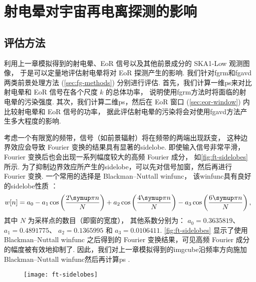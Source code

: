 
\chapter{射电晕对宇宙再电离探测的影响}
\label{chap:halo}

\section{评估方法}

利用上一章模拟得到的射电晕、EoR 信号以及其他前景成分的 SKA1-Low 观测图像，
于是可以定量地评估射电晕将对 EoR 探测产生的影响.
我们针对\ac{fgrm}和\ac{fgavd}两类前景处理方法 (\autoref{sec:fg-methods})
分别进行评估.
首先，我们计算一维\ac{ps}来对比射电晕和 EoR 信号在各个尺度 $k$ 的总体功率，
说明使用\ac{fgrm}方法时将面临的射电晕的污染强度.
其次，我们计算二维\ac{ps}，然后在 EoR 窗口 (\autoref{sec:eor-window})
内比较射电晕和 EoR 信号的功率，
据此评估射电晕的污染将会对使用\ac{fgavd}方法产生多大程度的影响.

考虑一个有限宽的频带，信号（如前景辐射）将在频带的两端出现跃变，
这种边界效应会导致 Fourier 变换的结果具有显著的\ac{sidelobe}.
即使输入信号非常平滑，Fourier 变换后也会出现一系列幅度较大的高频 Fourier 成分，
如\autoref{fig:ft-sidelobes} 所示.
为了抑制边界效应所产生的\ac{sidelobe}，可以先对信号加窗，然后再进行 Fourier 变换.
一个常用的选择是 Blackman--Nuttall \ac{winfunc}，
该\ac{winfunc}具有良好的\ac{sidelobe}性质 \cite{nuttall1981}：
\begin{equation}
  w[n] = a_0 - a_1 \cos\left(\frac{2\Cpi n}{N}\right)
    + a_2 \cos\left(\frac{4\Cpi n}{N}\right)
    - a_3 \cos\left(\frac{6\Cpi n}{N}\right) ,
\end{equation}
其中
$N$ 为采样点的数目（即窗的宽度），
其他系数分别为：
$a_0 = 0.3635819$、
$a_1 = 0.4891775$、
$a_2 = 0.1365995$ 和
$a_3 = 0.0106411$.
\autoref{fig:ft-sidelobes} 显示了使用 Blackman--Nuttall \ac{winfunc}
之后得到的 Fourier 变换结果，可见高频 Fourier 成分的幅度被有效地抑制了.
因此，我们对上一章模拟得到的\ac{imgcube}沿频率方向施加
Blackman--Nuttall \ac{winfunc}然后再计算\ac{ps}
\cite{trott2015,chapman2016}.

\begin{figure}[htp]
  \centering
  \texttt{[image: ft-sidelobes]}
  \label{fig:ft-sidelobes}
\end{figure}


